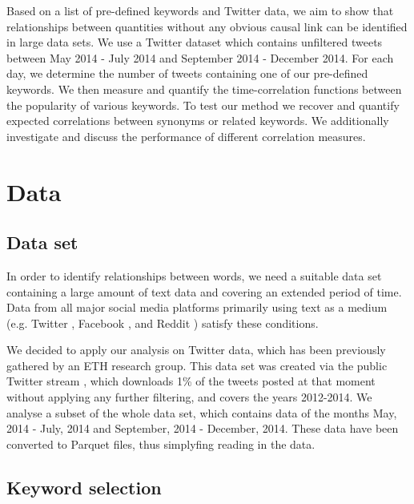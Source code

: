 \documentclass[12pt, a4paper]{article}
\begin{document}
Based on a list of pre-defined keywords and Twitter data, we aim to show that relationships between quantities without any obvious causal link can be identified in large data sets. 
We use a Twitter dataset which contains unfiltered tweets between May 2014 - July 2014 and September 2014 - December 2014. For each day, we determine the number of tweets containing one of our pre-defined keywords. We then measure and quantify the time-correlation functions between the popularity of various keywords. To test our method we recover and quantify expected correlations between synonyms or related keywords. We  additionally investigate and discuss the performance of different correlation measures.

\section{Data}
\subsection{Data set}
In order to identify relationships between words, we need a suitable data set containing a large amount of text data and covering an extended period of time. Data from all major social media platforms primarily using text as a medium (e.g. Twitter \cite{twitter}, Facebook \cite{facebook}, and Reddit \cite{reddit}) satisfy these conditions.

We decided to apply our analysis on Twitter data, which has been previously gathered by an ETH research group. This data set was created via the public Twitter stream \cite{twitterstream}, which downloads 1\% of the tweets posted at that moment without applying any further filtering, and covers the years 2012-2014. We analyse a subset of the whole data set, which contains data of the months May, 2014 - July, 2014 and September, 2014 - December, 2014. These data have been converted to Parquet files, thus simplyfing reading in the data.

\subsection{Keyword selection}
\end{document}
